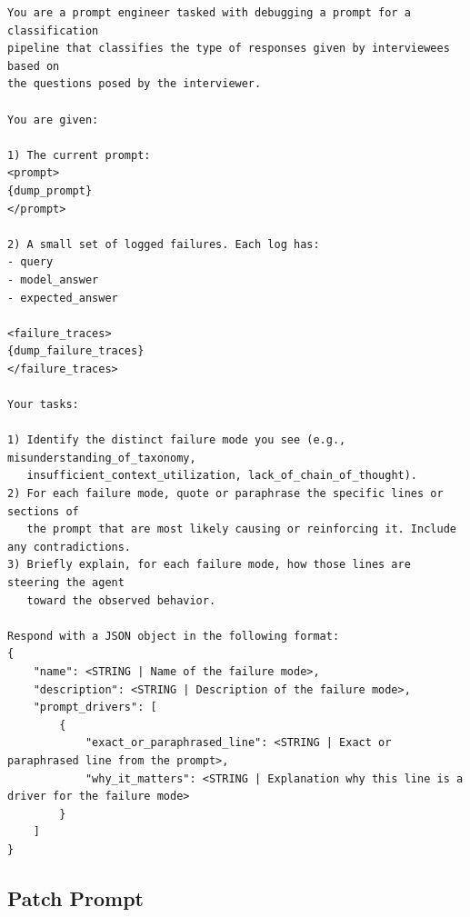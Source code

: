 \documentclass[11pt]{article}
\begin{document}
\begin{lstlisting}[style=yaml]
You are a prompt engineer tasked with debugging a prompt for a classification
pipeline that classifies the type of responses given by interviewees based on
the questions posed by the interviewer.

You are given:

1) The current prompt:
<prompt>
{dump_prompt}
</prompt>

2) A small set of logged failures. Each log has:
- query
- model_answer
- expected_answer

<failure_traces>
{dump_failure_traces}
</failure_traces>

Your tasks:

1) Identify the distinct failure mode you see (e.g., misunderstanding_of_taxonomy,
   insufficient_context_utilization, lack_of_chain_of_thought).
2) For each failure mode, quote or paraphrase the specific lines or sections of
   the prompt that are most likely causing or reinforcing it. Include any contradictions.
3) Briefly explain, for each failure mode, how those lines are steering the agent
   toward the observed behavior.

Respond with a JSON object in the following format:
{
    "name": <STRING | Name of the failure mode>,
    "description": <STRING | Description of the failure mode>,
    "prompt_drivers": [
        {
            "exact_or_paraphrased_line": <STRING | Exact or paraphrased line from the prompt>,
            "why_it_matters": <STRING | Explanation why this line is a driver for the failure mode>
        }
    ]
}
\end{lstlisting}

\subsection{Patch Prompt}
\label{sec:appendix-patch}
\end{document}
